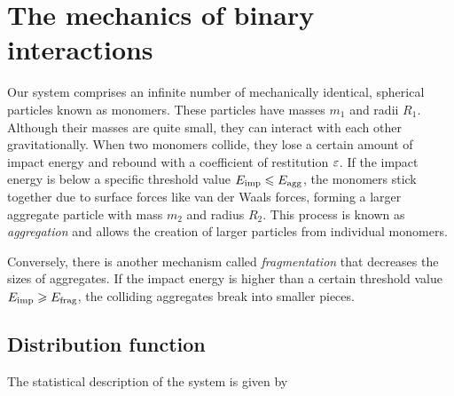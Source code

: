 \documentclass[aps,prl,preprint,groupedaddress,10pt]{revtex4-2}
\begin{document}
\section{The mechanics of binary interactions}
Our system comprises an infinite number of mechanically identical, spherical particles 
known as monomers. These particles have masses $m_1$ and radii $R_1$. Although their 
masses are quite small, they can interact with each other gravitationally. When two 
monomers collide, they lose a certain amount of impact energy and rebound with a 
coefficient of restitution $\varepsilon$. If the impact energy is below a specific threshold 
value $E_{\mathrm{imp}}\leqslant E_{\mathrm{agg}}$, the monomers stick together due to surface 
forces like van der Waals forces, forming a larger aggregate particle with mass $m_2$ 
and radius $R_2$. This process is known as \emph{aggregation} and allows the creation 
of larger particles from individual monomers.

Conversely, there is another mechanism called \emph{fragmentation} that decreases the 
sizes of aggregates. If the impact energy is higher than a certain threshold value 
$E_{\mathrm{imp}}\geqslant E_{\mathrm{frag}}$, the colliding aggregates break into smaller pieces.

\subsection{Distribution function}
The statistical description of the system is given by 
\end{document}
